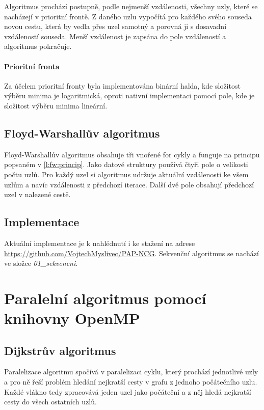 Algoritmus prochází postupně, podle nejmenší vzdálenosti, všechny uzly, které se nacházejí v prioritní frontě. Z daného uzlu vypočítá pro každého svého souseda novou cestu, která by vedla přes uzel samotný a porovná ji s dosavadní vzdáleností souseda. Menší vzdálenost je zapsána do pole vzdáleností a algoritmus pokračuje.

\paragraph{Prioritní fronta} \label{l:dij:fron}
Za účelem prioritní fronty byla implementována binární halda, kde složitost výběru minima je logaritmická, oproti nativní implementaci pomocí pole, kde je složitost výběru minima lineární.


\subsection{Floyd-Warshallův algoritmus}
Floyd-Warshallův algoritmus obsahuje tři vnořené for cykly a funguje na principu popsaném v \ref{l:fw:princip}. Jako datové struktury používá čtyři pole o velikosti počtu uzlů. Pro každý uzel si algoritmus udržuje aktuální vzdálenosti ke všem uzlům a navíc vzdálenosti z předchozí iterace. Další dvě pole obsahují předchozí uzel v nalezené cestě. 

\subsection{Implementace}
Aktuální implementace je k nahlédnutí i ke stažení na adrese \url{https://github.com/VojtechMyslivec/PAP-NCG}. Sekvenční algoritmus se nachází ve složce \textit{01\_sekvencni}.


\section{Paralelní algoritmus pomocí knihovny OpenMP}
\subsection{Dijkstrův algoritmus}
Paralelizace algoritmu spočívá v paralelizaci cyklu, který prochází jednotlivé uzly a pro ně řeší problém hledání nejkratší cesty v grafu z jednoho počátečního uzlu. Každé vlákno tedy zpracovává jeden uzel jako počáteční a z něj hledá nejkratší cesty do všech ostatních uzlů.

